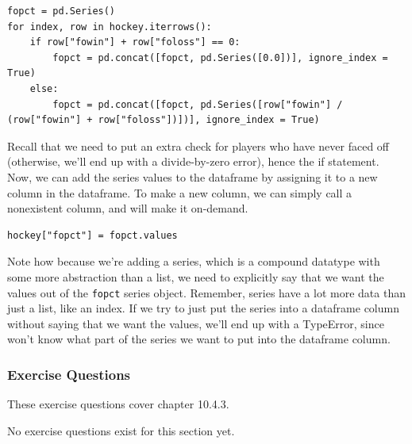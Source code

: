 \begin{lstlisting}[style=pippython]
fopct = pd.Series()
for index, row in hockey.iterrows():
	if row["fowin"] + row["foloss"] == 0:
		fopct = pd.concat([fopct, pd.Series([0.0])], ignore_index = True)
	else:
		fopct = pd.concat([fopct, pd.Series([row["fowin"] / (row["fowin"] + row["foloss"])])], ignore_index = True)
\end{lstlisting}
Recall that we need to put an extra check for players who have never faced off (otherwise, we'll end up with a divide-by-zero error), hence the if statement. Now, we can add the series values to the dataframe by assigning it to a new column in the dataframe. To make a new column, we can simply call a nonexistent column, and  will make it on-demand.\par
\begin{lstlisting}[style=pippython]
hockey["fopct"] = fopct.values
\end{lstlisting}
Note how because we're adding a series, which is a compound datatype with some more abstraction than a list, we need to explicitly say that we want the values out of the \verb|fopct| series object. Remember, series have a lot more data than just a list, like an index. If we try to just put the series into a dataframe column without saying that we want the values, we'll end up with a TypeError, since  won't know what part of the series we want to put into the dataframe column.\par

\subsubsection*{Exercise Questions}
These exercise questions cover chapter 10.4.3.

No exercise questions exist for this section yet.

